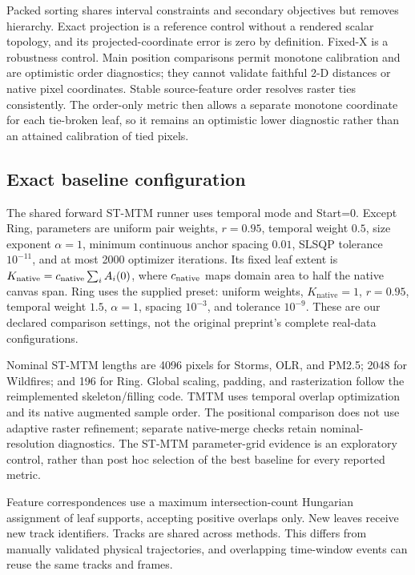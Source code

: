 Packed sorting shares interval constraints and secondary objectives but removes hierarchy. Exact projection is a reference control without a rendered scalar topology, and its projected-coordinate error is zero by definition. Fixed-X is a robustness control. Main position comparisons permit monotone calibration and are optimistic order diagnostics; they cannot validate faithful 2-D distances or native pixel coordinates. Stable source-feature order resolves raster ties consistently. The order-only metric then allows a separate monotone coordinate for each tie-broken leaf, so it remains an optimistic lower diagnostic rather than an attained calibration of tied pixels.


\subsection{Exact baseline configuration}
The shared forward ST-MTM runner uses temporal mode and Start=0. Except Ring, parameters are uniform pair weights, $r=0.95$, temporal weight $0.5$, size exponent $\alpha=1$, minimum continuous anchor spacing $0.01$, SLSQP tolerance $10^{-11}$, and at most 2000 optimizer iterations. Its fixed leaf extent is $K_{\mathrm{native}}=c_{\rm native}\sum_i A_i(0)$, where $c_{\rm native}$ maps domain area to half the native canvas span. Ring uses the supplied preset: uniform weights, $K_{\mathrm{native}}=1$, $r=0.95$, temporal weight $1.5$, $\alpha=1$, spacing $10^{-3}$, and tolerance $10^{-9}$. These are our declared comparison settings, not the original preprint's complete real-data configurations.

Nominal ST-MTM lengths are 4096 pixels for Storms, OLR, and PM2.5; 2048 for Wildfires; and 196 for Ring. Global scaling, padding, and rasterization follow the reimplemented skeleton/filling code. TMTM uses temporal overlap optimization and its native augmented sample order. The positional comparison does not use adaptive raster refinement; separate native-merge checks retain nominal-resolution diagnostics. The ST-MTM parameter-grid evidence is an exploratory control, rather than post hoc selection of the best baseline for every reported metric.

Feature correspondences use a maximum intersection-count Hungarian assignment of leaf supports, accepting positive overlaps only. New leaves receive new track identifiers. Tracks are shared across methods. This differs from manually validated physical trajectories, and overlapping time-window events can reuse the same tracks and frames.

